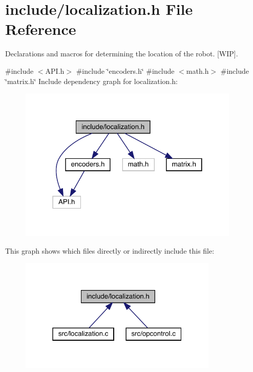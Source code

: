 \section{include/localization.h File Reference}
\label{localization_8h}


Declarations and macros for determining the location of the robot. [W\+IP].  


{\ttfamily \#include $<$A\+P\+I.\+h$>$}\newline
{\ttfamily \#include \char`\"{}encoders.\+h\char`\"{}}\newline
{\ttfamily \#include $<$math.\+h$>$}\newline
{\ttfamily \#include \char`\"{}matrix.\+h\char`\"{}}\newline
Include dependency graph for localization.\+h\+:
\nopagebreak
\begin{figure}[H]
\begin{center}
\leavevmode
\includegraphics[width=298pt]{localization_8h__incl}
\end{center}
\end{figure}
This graph shows which files directly or indirectly include this file\+:
\nopagebreak
\begin{figure}[H]
\begin{center}
\leavevmode
\includegraphics[width=268pt]{localization_8h__dep__incl}
\end{center}
\end{figure}
